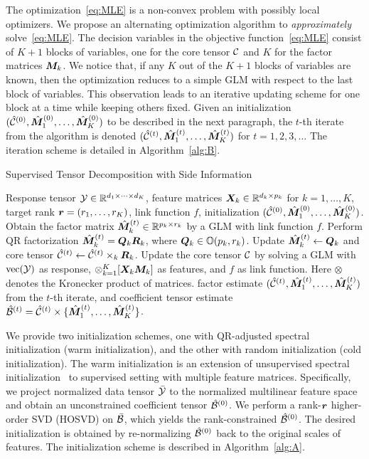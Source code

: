 \documentclass[12pt]{article}
\theoremstyle{definition}
\theoremstyle{definition}
\begin{document}
The optimization~\eqref{eq:MLE} is a non-convex problem with possibly local optimizers. We propose an alternating optimization algorithm to {\it approximately} solve~\eqref{eq:MLE}. 
The decision variables in the objective function~\eqref{eq:MLE} consist of $K+1$ blocks of variables, one for the core tensor $\mathcal{C}$ and $K$ for the factor matrices $\bm M_k$. We notice that, if any $K$ out of the $K+1$ blocks of variables are known, then the optimization reduces to a simple GLM with respect to the last block of variables. This observation leads to an iterative updating scheme for one block at a time while keeping others fixed. Given an initialization $(\hat{\mathcal{C}}^{(0)},\hat{\bm M}_1^{(0)}, \ldots, \hat{\bm M}_K^{(0)})$ to be described in the next paragraph, the $t$-th iterate from the algorithm is denoted $(\hat{\mathcal{C}}^{(t)},  \hat{\bm M}^{(t)}_1,\ldots,\hat{\bm M}^{(t)}_K)$ for $t=1, 2,3, \ldots$ The iteration scheme is detailed in Algorithm~\ref{alg:B}. 
\begin{algorithm}[!h]
\caption{Supervised Tensor Decomposition with Side Information}\label{alg:B}
\begin{algorithmic}[1]
\INPUT Response tensor $\mathcal{Y}\in \mathbb{R}^{d_1\times \cdots \times d_K}$, feature matrices $\bm X_k\in\mathbb{R}^{d_k\times p_k}$ for $k=1,\ldots,K$, target rank $\bm{r}=(r_1,\ldots,r_K)$, link function $f$, initialization $(\hat{\mathcal{C}}^{(0)},\hat {\bm M}^{(0)}_1,\ldots,\hat{\bm M}^{(0)}_K)$.
\State Obtain the factor matrix $\hat{\bm M}^{(t)}_k\in\mathbb{R}^{p_k\times r_k}$ by a GLM with link function $f$.
\State Perform QR factorization $\hat{\bm M}^{(t)}_k=\bm{Q}_k\bm{R}_k$, where $\bm{Q}_k\in\mathbb{O}(p_k, r_k)$.
\State Update $\hat{\bm M}^{(t)}_k\leftarrow \bm{Q}_k$ and core tensor $\hat{\mathcal{C}}^{(t)}\leftarrow \hat{\mathcal{C}}^{(t)}\times_k \bm{R}_k$.
\EndFor
\State Update the core tensor $\mathcal{C}$ by solving a GLM with $\textup{vec}(\mathcal{Y})$ as response, $\otimes_{k=1}^K[ \bm X_k\bm M_k]$ as features, and $f$ as link function. Here $\otimes$ denotes the Kronecker product of matrices. 
\EndFor
\OUTPUT factor estimate $(\hat{\mathcal{C}}^{(t)}, \hat{\bm M}^{(t)}_1,\ldots,\hat{\bm M}^{(t)}_K)$ from the $t$-th iterate, and coefficient tensor estimate $\hat{\mathcal{B}}^{(t)}=\hat{\mathcal{C}}^{(t)}\times\{\hat{\bm M}^{(t)}_1,\ldots, \hat{\bm M}^{(t)}_K\}$.
\end{algorithmic}
\end{algorithm}

{  We provide two initialization schemes, one with QR-adjusted spectral initialization (warm initialization), and the other with random initialization (cold initialization). The warm initialization is an extension of unsupervised spectral initialization~\citep{zhang2018tensor} to supervised setting with multiple feature matrices.} Specifically, we project normalized data tensor $\bar {\mathcal{Y}}$ to the normalized multilinear feature space and obtain an unconstrained coefficient tensor $\hat{\mathcal{B}}^{(0)}$. We perform a rank-$\bm{r}$ higher-order SVD (HOSVD) on $\bar {\mathcal{B}}$, which yields the rank-constrained $\hat{\mathcal{B}}^{(0)}$. The desired initialization is obtained by re-normalizing $\hat{\mathcal{B}}^{(0)}$ back to the original scales of features. The initialization scheme is described in Algorithm~\ref{alg:A}. 
\end{document}
